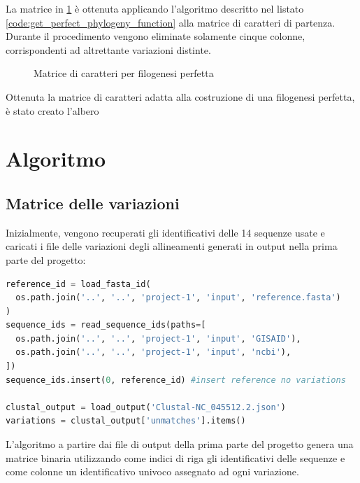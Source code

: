 \documentclass[11pt,italian]{article}
\begin{document}
La matrice in \cref{fig:matrix-perfect-phylo} è ottenuta applicando l'algoritmo descritto nel listato \ref{code:get_perfect_phylogeny_function} alla matrice di caratteri di partenza. Durante il procedimento vengono eliminate solamente cinque colonne, corrispondenti ad altrettante variazioni distinte.
\begin{figure}[H]
  \caption{Matrice di caratteri per filogenesi perfetta}
  \label{fig:matrix-perfect-phylo}
\end{figure}

Ottenuta la matrice di caratteri adatta alla costruzione di una filogenesi perfetta, è stato creato l'albero

\newpage
\section{Algoritmo}
\subsection{Matrice delle variazioni}
Inizialmente, vengono recuperati gli identificativi delle 14 sequenze usate e caricati i file delle variazioni degli allineamenti generati in output nella prima parte del progetto:

\begin{lstlisting}[language=Python,caption=Caricamento dei file necessari per l'elaborazione,label=code:read_input_files]
reference_id = load_fasta_id(
  os.path.join('..', '..', 'project-1', 'input', 'reference.fasta')
)
sequence_ids = read_sequence_ids(paths=[
  os.path.join('..', '..', 'project-1', 'input', 'GISAID'),
  os.path.join('..', '..', 'project-1', 'input', 'ncbi'),
])
sequence_ids.insert(0, reference_id) #insert reference no variations

clustal_output = load_output('Clustal-NC_045512.2.json')
variations = clustal_output['unmatches'].items()
\end{lstlisting}

\noindent
L'algoritmo a partire dai file di output della prima parte del progetto genera una matrice binaria utilizzando come indici di riga gli identificativi delle sequenze e come colonne un identificativo univoco assegnato ad ogni variazione.
\end{document}
